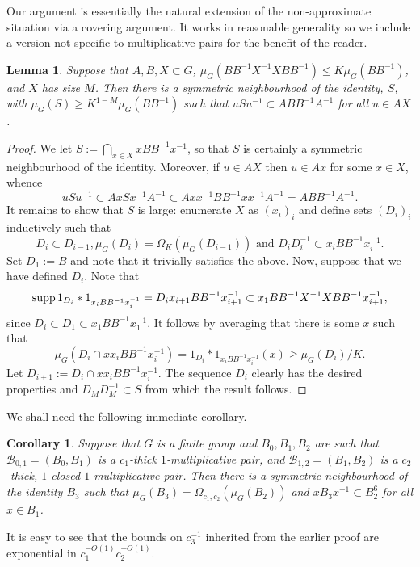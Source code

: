 \documentclass[12pt]{amsart}
\numberwithin{equation}{section}
\theoremstyle{plain}
\newtheorem{lemma}[subsection]{Lemma}
\newtheorem{corollary}[subsection]{Corollary}
\theoremstyle{definition}
\renewcommand{\leq}{\leqslant}
\renewcommand{\geq}{\geqslant}
\providecommand{\supp}{\mathop{\rm supp}\nolimits}
\begin{document}
Our argument is essentially the natural extension of the non-approximate situation via a covering argument.  It works in reasonable generality so we include a version not specific to multiplicative pairs for the benefit of the reader.
\begin{lemma}
Suppose that $A,B,X \subset G$, $\mu_G(BB^{-1}X^{-1}XBB^{-1})\leq K \mu_G(BB^{-1})$, and $X$ has size $M$.  Then there is a symmetric neighbourhood of the identity, $S$, with $\mu_G(S) \geq K^{1-M}\mu_G(BB^{-1})$ such that $uSu^{-1} \subset ABB^{-1}A^{-1}$ for all $u \in AX$. 
\end{lemma}
\begin{proof}
We let $S:=\bigcap_{x \in X}{xBB^{-1}x^{-1}}$, so that $S$ is certainly a symmetric neighbourhood of the identity.  Moreover, if $u \in AX$ then $u \in Ax$ for some $x \in X$, whence
\begin{equation*}
uSu^{-1} \subset AxSx^{-1}A^{-1} \subset Axx^{-1}BB^{-1}xx^{-1}A^{-1} = ABB^{-1}A^{-1}.
\end{equation*}
It remains to show that $S$ is large: enumerate $X$ as $(x_i)_i$ and define sets $(D_i)_i$ inductively such that
\begin{equation*}
D_i \subset D_{i-1}, \mu_G(D_i) = \Omega_{K}(\mu_G(D_{i-1})) \textrm{ and } D_{i}D_{i}^{-1}\subset x_{i}BB^{-1}x_{i}^{-1}.
\end{equation*}
Set $D_1:=B$ and note that it trivially satisfies the above.  Now, suppose that we have defined $D_i$.  Note that
\begin{equation*}
\supp{1_{D_i} \ast 1_{x_iBB^{-1}x_i^{-1}}} = D_ix_{i+1}BB^{-1}x_{i+1}^{-1} \subset x_1BB^{-1}X^{-1}XBB^{-1}x_{i+1}^{-1},
\end{equation*}
since $D_i \subset D_1 \subset x_1BB^{-1}x_1^{-1}$.  It follows by averaging that there is some $x$ such that
\begin{equation*}
\mu_G(D_i \cap xx_iBB^{-1}x_i^{-1})=1_{D_i} \ast 1_{x_iBB^{-1}x_i^{-1}}(x) \geq \mu_G(D_i)/K.
\end{equation*}
Let $D_{i+1}:=D_i \cap xx_iBB^{-1}x_i^{-1}$. The sequence $D_i$ clearly has the desired properties and $D_{M}D_{M}^{-1} \subset S$ from which the result follows.
\end{proof}
We shall need the following immediate corollary.
\begin{corollary}\label{cor.apnorm}
Suppose that $G$ is a finite group and $B_0,B_1,B_2$ are such that $\mathcal{B}_{0,1}=(B_0,B_1)$ is a $c_1$-thick $1$-multiplicative pair, and $\mathcal{B}_{1,2}=(B_1,B_2)$ is a $c_2$-thick, $1$-closed $1$-multiplicative pair.  Then there is a symmetric neighbourhood of the identity $B_3$ such that $\mu_G(B_3)=\Omega_{c_1,c_2}(\mu_G(B_2))$ and $xB_3x^{-1} \subset B_2^6$ for all $x \in B_1$.
\end{corollary}
It is easy to see that the bounds on $c_3^{-1}$ inherited from the earlier proof are exponential in $c_1^{-O(1)}c_2^{-O(1)}$.
\end{document}
